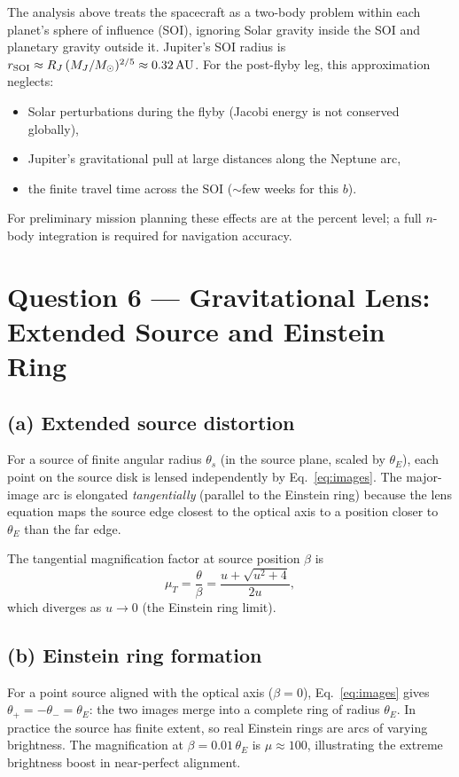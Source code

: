 \documentclass[11pt, a4paper]{article}
\newcommand{\thetaE}{\theta_{\!E}}
\newcommand{\unit}[1]{\,\mathrm{#1}}
\begin{document}
The analysis above treats the spacecraft as a two-body problem within each planet's
sphere of influence (SOI), ignoring Solar gravity inside the SOI and planetary gravity
outside it.  Jupiter's SOI radius is $r_{\rm SOI} \approx R_J\,(M_J/M_\odot)^{2/5}
\approx 0.32\unit{AU}$.  For the post-flyby leg, this approximation neglects:
\begin{itemize}[nosep]
  \item Solar perturbations during the flyby (Jacobi energy is not conserved globally),
  \item Jupiter's gravitational pull at large distances along the Neptune arc,
  \item the finite travel time across the SOI ($\sim$few weeks for this $b$).
\end{itemize}
For preliminary mission planning these effects are at the percent level; a full
$n$-body integration is required for navigation accuracy.

\section{Question 6 — Gravitational Lens: Extended Source and Einstein Ring}

\subsection*{(a) Extended source distortion}

For a source of finite angular radius $\theta_s$ (in the source plane, scaled by
$\thetaE$), each point on the source disk is lensed independently by Eq.~\eqref{eq:images}.
The major-image arc is elongated \emph{tangentially} (parallel to the Einstein ring)
because the lens equation maps the source edge closest to the optical axis to a
position closer to $\thetaE$ than the far edge.

The tangential magnification factor at source position $\beta$ is
\[
  \mu_T = \frac{\theta}{\beta} = \frac{u + \sqrt{u^2+4}}{2u},
\]
which diverges as $u \to 0$ (the Einstein ring limit).

\subsection*{(b) Einstein ring formation}

For a point source aligned with the optical axis ($\beta = 0$), Eq.~\eqref{eq:images}
gives $\theta_+ = -\theta_- = \thetaE$: the two images merge into a complete ring of
radius $\thetaE$.  In practice the source has finite extent, so real Einstein rings
are arcs of varying brightness.  The magnification at $\beta = 0.01\,\thetaE$ is
$\mu \approx 100$, illustrating the extreme brightness boost in near-perfect alignment.
\end{document}
